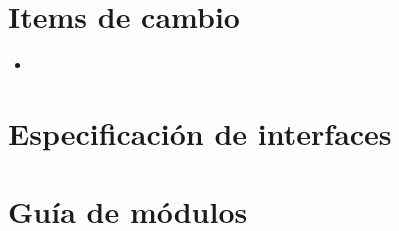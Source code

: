 \documentclass[12pt,a4paper,fleqn]{article}
\begin{document}
\section{Items de cambio}
\begin{itemize}
  \item 
\end{itemize}

\section{Especificación de interfaces}

\section{Guía de módulos}
\end{document}
